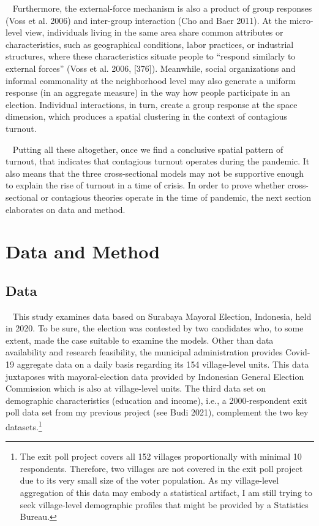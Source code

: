 \documentclass[
  12pt,
]{article}
\begin{document}
~ Furthermore, the external-force mechanism is also a product of group
responses (Voss et al. 2006) and inter-group interaction (Cho and Baer
2011). At the micro-level view, individuals living in the same area
share common attributes or characteristics, such as geographical
conditions, labor practices, or industrial structures, where these
characteristics situate people to ``respond similarly to external
forces'' (Voss et al. 2006, {[}376{]}). Meanwhile, social organizations
and informal commonality at the neighborhood level may also generate a
uniform response (in an aggregate measure) in the way how people
participate in an election. Individual interactions, in turn, create a
group response at the space dimension, which produces a spatial
clustering in the context of contagious turnout.

~ Putting all these altogether, once we find a conclusive spatial
pattern of turnout, that indicates that contagious turnout operates
during the pandemic. It also means that the three cross-sectional models
may not be supportive enough to explain the rise of turnout in a time of
crisis. In order to prove whether cross-sectional or contagious theories
operate in the time of pandemic, the next section elaborates on data and
method.

\hypertarget{data-and-method}{%
\section{Data and Method}\label{data-and-method}}

\hypertarget{data}{%
\subsection{Data}\label{data}}

~ This study examines data based on Surabaya Mayoral Election,
Indonesia, held in 2020. To be sure, the election was contested by two
candidates who, to some extent, made the case suitable to examine the
models. Other than data availability and research feasibility, the
municipal administration provides Covid-19 aggregate data on a daily
basis regarding its 154 village-level units. This data juxtaposes with
mayoral-election data provided by Indonesian General Election Commission
which is also at village-level units. The third data set on demographic
characteristics (education and income), i.e., a 2000-respondent exit
poll data set from my previous project (see Budi 2021), complement the
two key datasets.\footnote{The exit poll project covers all 152 villages
  proportionally with minimal 10 respondents. Therefore, two villages
  are not covered in the exit poll project due to its very small size of
  the voter population. As my village-level aggregation of this data may
  embody a statistical artifact, I am still trying to seek village-level
  demographic profiles that might be provided by a Statistics Bureau.}
\end{document}

